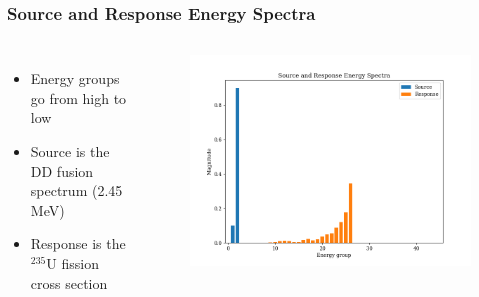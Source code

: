 \documentclass[t]{beamer}
\newcommand{\tildecenter}{\raisebox{0.5ex}{\texttildelow}}
\begin{document}
\begin{frame}
  \frametitle{Source and Response Energy Spectra}
  \begin{columns}[c]
    \begin{itemize}
      \item Energy groups go from high to low
      \item Source is the DD fusion spectrum (\tildecenter 2.45 MeV)
      \item Response is the ${}^{235}\text{U}$ fission cross section
    \end{itemize}
    \begin{figure}
      \includegraphics[trim={0.4in 0.2in 0.75in 0.4in},clip,scale=0.45]{images/spectra_lin.png}
    \end{figure}
  \end{columns}
\end{frame}
\end{document}
